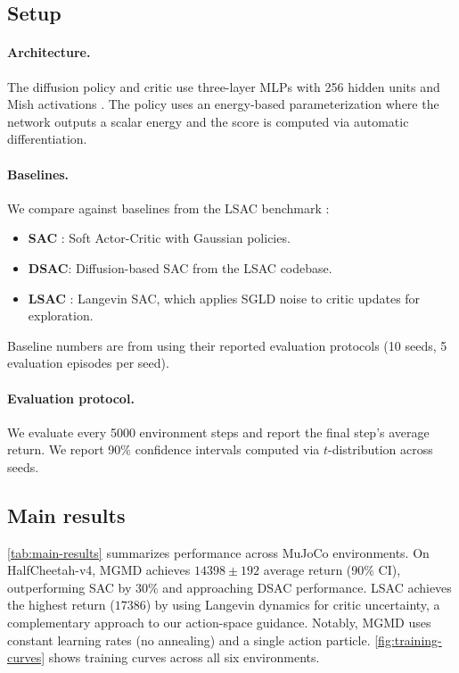 \documentclass{article}
\theoremstyle{plain}
\theoremstyle{definition}
\theoremstyle{remark}
\begin{document}
\subsection{Setup}

\paragraph{Architecture.}
The diffusion policy and critic use three-layer MLPs with 256 hidden units and Mish activations \citep{misra2019mish}.
The policy uses an energy-based parameterization where the network outputs a scalar energy and the score is computed via automatic differentiation.

\paragraph{Baselines.}
We compare against baselines from the LSAC benchmark \citep{lsac2025}:
\begin{itemize}
  \item \textbf{SAC} \citep{haarnoja2018sac}: Soft Actor-Critic with Gaussian policies.
  \item \textbf{DSAC}: Diffusion-based SAC from the LSAC codebase.
  \item \textbf{LSAC} \citep{lsac2025}: Langevin SAC, which applies SGLD noise to critic updates for exploration.
\end{itemize}
Baseline numbers are from \citet{lsac2025} using their reported evaluation protocols (10 seeds, 5 evaluation episodes per seed).

\paragraph{Evaluation protocol.}
We evaluate every 5000 environment steps and report the final step's average return.
We report 90\% confidence intervals computed via $t$-distribution across seeds.

\subsection{Main results}

\cref{tab:main-results} summarizes performance across MuJoCo environments.
On HalfCheetah-v4, MGMD achieves $14398 \pm 192$ average return (90\% CI), outperforming SAC by 30\% and approaching DSAC performance.
LSAC achieves the highest return ($17386$) by using Langevin dynamics for critic uncertainty, a complementary approach to our action-space guidance.
Notably, MGMD uses constant learning rates (no annealing) and a single action particle.
\cref{fig:training-curves} shows training curves across all six environments.
\end{document}
